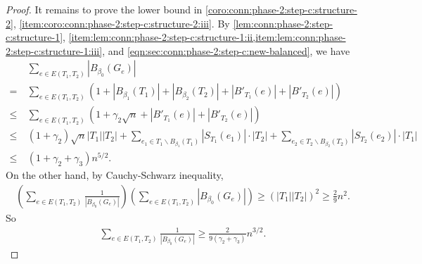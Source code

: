 \begin{proof}
  It remains to prove the lower bound in \cref{coro:conn:phase-2:step-c:structure-2}, \cref{item:coro:conn:phase-2:step-c:structure-2:iii}.
  By \cref{lem:conn:phase-2:step-c:structure-1}, \cref{item:lem:conn:phase-2:step-c:structure-1:ii,item:lem:conn:phase-2:step-c:structure-1:iii}, and \cref{eqn:sec:conn:phase-2:step-c:new-balanced}, we have
  \begin{align*}
    &~\sum_{e\in E(T_1,T_2)} \left| B_{\beta_0}(G_e) \right| \\
    \nonumber =&~ \sum_{e\in E(T_1,T_2)} \left(1 + \left| B_{\beta_1}(T_1) \right| + \left| B_{\beta_2}(T_2) \right| + \left| B'_{T_1}(e) \right| + \left| B'_{T_2}(e) \right|\right) \\
    \nonumber \le&~ \sum_{e\in E(T_1,T_2)} \left( 1 + \gamma_2 \sqrt n + \left| B'_{T_1}(e) \right| + \left| B'_{T_2}(e) \right|\right) \\
    \nonumber \le&~ (1+\gamma_2) \sqrt n |T_1||T_2| + \sum_{e_1\in T_1\backslash B_{\beta_1}(T_1)} \left| S_{T_1}(e_1) \right| \cdot |T_2|
    + \sum_{e_2\in T_2\backslash B_{\beta_2}(T_2)} \left| S_{T_2}(e_2) \right| \cdot |T_1| \\
    \nonumber \le&~ (1 + \gamma_2+\gamma_3) n^{5/2}.
  \end{align*}
  On the other hand, by Cauchy-Schwarz inequality,
  \begin{align*}
    \left( \sum_{e\in E(T_1,T_2)} \frac 1{\left| B_{\beta_0}(G_e) \right|} \right)\left( \sum_{e\in E(T_1,T_2)} \left| B_{\beta_0}(G_e) \right| \right)
    \ge (|T_1||T_2|)^2 \ge \frac 29 n^2.
  \end{align*}
  So
  \begin{align*}
    \sum_{e\in E(T_1,T_2)} \frac 1{\left| B_{\beta_0}(G_e) \right|} \ge \frac 2{9(\gamma_2+\gamma_3)} n^{3/2}.
  \end{align*}
\end{proof}

